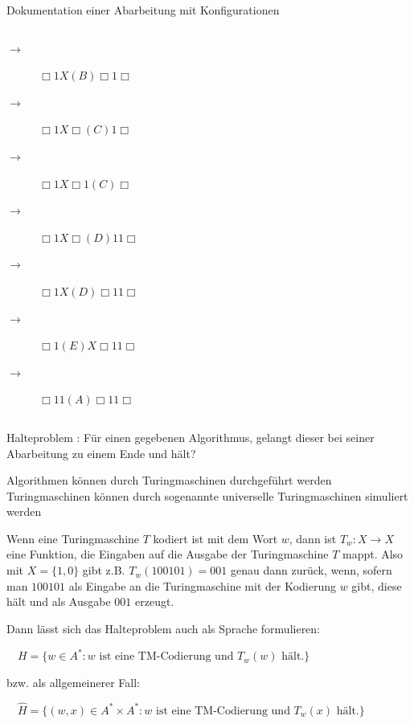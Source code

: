 \documentclass{beamer}
\begin{document}
\begin{frame}{Dokumentation einer Abarbeitung mit Konfigurationen}
\begin{columns}
		\begin{column}{0.4\textwidth}
			\begin{description}
				\pause\item[$\rightarrow$] $\Box 1 X (B) \Box 1\Box$
				\pause\item[$\rightarrow$] $\Box 1 X \Box (C) 1\Box$
				\pause\item[$\rightarrow$] $\Box 1 X \Box 1 (C)\Box$
				\pause\item[$\rightarrow$] $\Box 1 X \Box (D) 1 1\Box$
				\pause\item[$\rightarrow$] $\Box 1 X (D) \Box 1 1\Box$
				\pause\item[$\rightarrow$] $\Box 1 (E) X \Box 1 1\Box$
				\pause\item[$\rightarrow$] $\Box 1 1 (A) \Box 1 1\Box$
			\end{description}
		\end{column}
	\end{columns}
\end{frame}

\begin{frame}{Halteproblem}
	: Für einen gegebenen Algorithmus, gelangt dieser bei seiner Abarbeitung zu einem Ende und hält?
	
	\begin{itemize}
		\pitem Algorithmen können durch Turingmaschinen durchgeführt werden
		\pitem Turingmaschinen können durch sogenannte universelle Turingmaschinen simuliert werden
		\begin{itemize}
			\pitem Wenn eine Turingmaschine $T$ kodiert ist mit dem Wort $w$, dann ist $T_w: X \rightarrow X$ eine Funktion, die Eingaben auf die Ausgabe der Turingmaschine $T$ mappt.
			\pitem Also mit $X = \{1,0\}$ gibt z.B. $T_w(100101) = 001$ genau dann zurück, wenn, sofern man $100101$ als Eingabe an die Turingmaschine mit der Kodierung $w$ gibt, diese hält und als Ausgabe $001$ erzeugt.
		\end{itemize}
	\end{itemize}

	\bp
	
	Dann lässt sich das Halteproblem auch als Sprache formulieren:
	
	\vspace{.2cm}
	
	$\quad H = \{w \in A^* : w \text{ ist eine TM-Codierung und } T_w(w) \text{ hält.}\}$
	
	bzw. als allgemeinerer Fall:
	
	$\quad \hat{H} = \{(w,x) \in A^* \times A^* : w \text{ ist eine TM-Codierung und } T_w(x) \text{ hält.}\}$
\end{frame}
\end{document}

